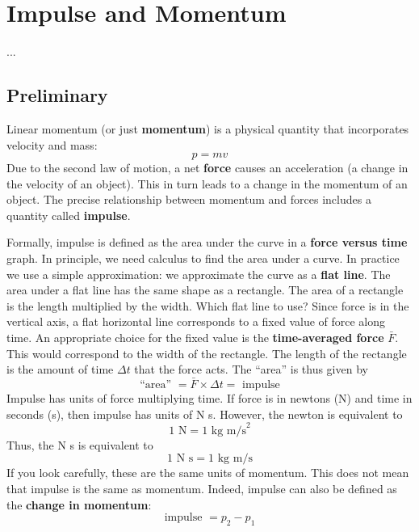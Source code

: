 \chapter{Impulse and Momentum}
...
\section{Preliminary}
Linear momentum (or just \textbf{momentum}) is a physical quantity that incorporates velocity and mass:
\begin{equation}
    p = m v
\end{equation}
Due to the second law of motion, a net \textbf{force} causes an acceleration (a change in the velocity of an object). This in turn leads to a change in the momentum of an object. The precise relationship between momentum and forces includes a quantity called \textbf{impulse}.

Formally, impulse is defined as the area under the curve in a \textbf{force versus time} graph. In principle, we need calculus to find the area under a curve. In practice we use a simple approximation: we approximate the curve as a \textbf{flat line}. The area under a flat line has the same shape as a rectangle. The area of a rectangle is the length multiplied by the width. Which flat line to use? Since force is in the vertical axis, a flat horizontal line corresponds to a fixed value of force along time. An appropriate choice for the fixed value is the \textbf{time-averaged force} $\bar{F}$. This would correspond to the width of the rectangle. The length of the rectangle is the amount of time $\Delta t$ that the force acts. The ``area'' is thus given by
\begin{equation}
    \text{``area'' } = \bar{F} \times \Delta t = \text{ impulse}
\end{equation}
Impulse has units of force multiplying time. If force is in newtons (N) and time in seconds (s), then impulse has units of N s. However, the newton is equivalent to
\begin{equation}
    1 \text{ N} = 1 \text{ kg m/s}^{2}
\end{equation}
Thus, the N s is equivalent to
\begin{equation}
    1 \text{ N s} = 1 \text{ kg m/s}
\end{equation}
If you look carefully, these are the same units of momentum. This does not mean that impulse is the same as momentum. Indeed, impulse can also be defined as the \textbf{change in momentum}:
\begin{equation}
    \text{impulse } = p_{2} - p_{1}
\end{equation}
